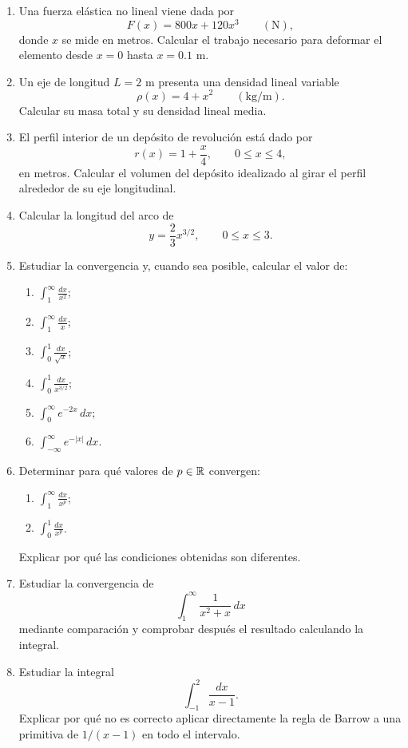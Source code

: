 \begin{enumerate}
\item Una fuerza elástica no lineal viene dada por
\[
F(x)=800x+120x^3\qquad (\mathrm{N}),
\]
donde $x$ se mide en metros. Calcular el trabajo necesario para deformar el elemento desde $x=0$ hasta $x=0.1$ m.

\item Un eje de longitud $L=2$ m presenta una densidad lineal variable
\[
\rho(x)=4+x^2\qquad (\mathrm{kg/m}).
\]
Calcular su masa total y su densidad lineal media.

\item El perfil interior de un depósito de revolución está dado por
\[
r(x)=1+\frac{x}{4},
\qquad 0\leq x\leq4,
\]
en metros. Calcular el volumen del depósito idealizado al girar el perfil alrededor de su eje longitudinal.

\item Calcular la longitud del arco de
\[
y=\frac23x^{3/2},
\qquad 0\leq x\leq3.
\]

\item Estudiar la convergencia y, cuando sea posible, calcular el valor de:
\begin{enumerate}[label=\alph*)]
\item $\displaystyle\int_1^{\infty}\frac{dx}{x^2}$;
\item $\displaystyle\int_1^{\infty}\frac{dx}{x}$;
\item $\displaystyle\int_0^1\frac{dx}{\sqrt{x}}$;
\item $\displaystyle\int_0^1\frac{dx}{x^{3/2}}$;
\item $\displaystyle\int_0^{\infty}e^{-2x}\,dx$;
\item $\displaystyle\int_{-\infty}^{\infty}e^{-|x|}\,dx$.
\end{enumerate}

\item Determinar para qué valores de $p\in\mathbb{R}$ convergen:
\begin{enumerate}[label=\alph*)]
\item $\displaystyle\int_1^{\infty}\frac{dx}{x^p}$;
\item $\displaystyle\int_0^1\frac{dx}{x^p}$.
\end{enumerate}
Explicar por qué las condiciones obtenidas son diferentes.

\item Estudiar la convergencia de
\[
\int_1^{\infty}\frac{1}{x^2+x}\,dx
\]
mediante comparación y comprobar después el resultado calculando la integral.

\item Estudiar la integral
\[
\int_{-1}^{2}\frac{dx}{x-1}.
\]
Explicar por qué no es correcto aplicar directamente la regla de Barrow a una primitiva de $1/(x-1)$ en todo el intervalo.


\end{enumerate}
